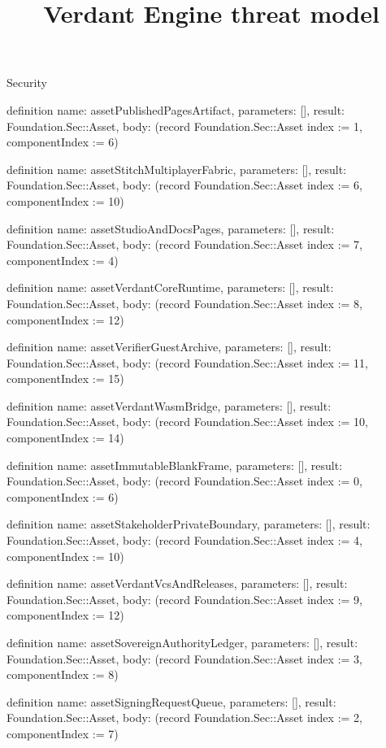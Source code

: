 \begin{lexlean}{Security}
\title{Verdant Engine threat model}
\begin{semanticmodule}
definition{
  name: assetPublishedPagesArtifact,
  parameters: [],
  result: Foundation.Sec::Asset,
  body: (record Foundation.Sec::Asset {index := 1, componentIndex := 6})
}

definition{
  name: assetStitchMultiplayerFabric,
  parameters: [],
  result: Foundation.Sec::Asset,
  body: (record Foundation.Sec::Asset {index := 6, componentIndex := 10})
}

definition{
  name: assetStudioAndDocsPages,
  parameters: [],
  result: Foundation.Sec::Asset,
  body: (record Foundation.Sec::Asset {index := 7, componentIndex := 4})
}

definition{
  name: assetVerdantCoreRuntime,
  parameters: [],
  result: Foundation.Sec::Asset,
  body: (record Foundation.Sec::Asset {index := 8, componentIndex := 12})
}

definition{
  name: assetVerifierGuestArchive,
  parameters: [],
  result: Foundation.Sec::Asset,
  body: (record Foundation.Sec::Asset {index := 11, componentIndex := 15})
}

definition{
  name: assetVerdantWasmBridge,
  parameters: [],
  result: Foundation.Sec::Asset,
  body: (record Foundation.Sec::Asset {index := 10, componentIndex := 14})
}

definition{
  name: assetImmutableBlankFrame,
  parameters: [],
  result: Foundation.Sec::Asset,
  body: (record Foundation.Sec::Asset {index := 0, componentIndex := 6})
}

definition{
  name: assetStakeholderPrivateBoundary,
  parameters: [],
  result: Foundation.Sec::Asset,
  body: (record Foundation.Sec::Asset {index := 4, componentIndex := 10})
}

definition{
  name: assetVerdantVcsAndReleases,
  parameters: [],
  result: Foundation.Sec::Asset,
  body: (record Foundation.Sec::Asset {index := 9, componentIndex := 12})
}

definition{
  name: assetSovereignAuthorityLedger,
  parameters: [],
  result: Foundation.Sec::Asset,
  body: (record Foundation.Sec::Asset {index := 3, componentIndex := 8})
}

definition{
  name: assetSigningRequestQueue,
  parameters: [],
  result: Foundation.Sec::Asset,
  body: (record Foundation.Sec::Asset {index := 2, componentIndex := 7})
}


\end{semanticmodule}
\end{lexlean}
